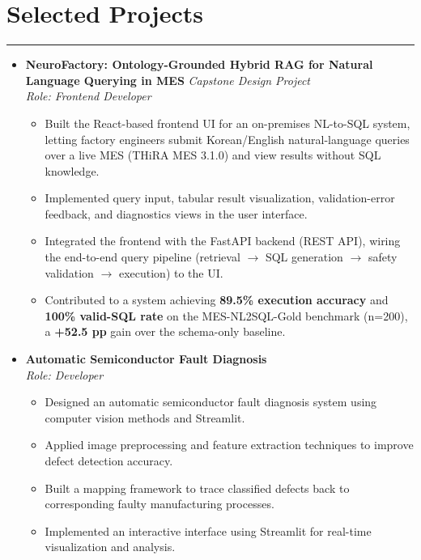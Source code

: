 \documentclass[letterpaper, 10pt]{article}
\begin{document}
\section*{Selected Projects}
\hrule
\vspace{1pt}
\begin{itemize}
    \item[]
        \textbf{NeuroFactory: Ontology-Grounded Hybrid RAG for Natural Language Querying in MES} \hfill \textit{Capstone Design Project} \\
        \textit{Role: Frontend Developer} \vspace{1pt}
        \begin{itemize}
            \item Built the React-based frontend UI for an on-premises NL-to-SQL system, letting factory engineers submit Korean/English natural-language queries over a live MES (THiRA MES 3.1.0) and view results without SQL knowledge.
            \item Implemented query input, tabular result visualization, validation-error feedback, and diagnostics views in the user interface.
            \item Integrated the frontend with the FastAPI backend (REST API), wiring the end-to-end query pipeline (retrieval $\rightarrow$ SQL generation $\rightarrow$ safety validation $\rightarrow$ execution) to the UI.
            \item Contributed to a system achieving \textbf{89.5\% execution accuracy} and \textbf{100\% valid-SQL rate} on the MES-NL2SQL-Gold benchmark (n=200), a \textbf{+52.5 pp} gain over the schema-only baseline.
        \end{itemize}
    \item[]
        \textbf{Automatic Semiconductor Fault Diagnosis} \\
        \textit{Role: Developer} \vspace{1pt}
        \begin{itemize}
            \item Designed an automatic semiconductor fault diagnosis system using computer vision methods and Streamlit.
            \item Applied image preprocessing and feature extraction techniques to improve defect detection accuracy.
            \item Built a mapping framework to trace classified defects back to corresponding faulty manufacturing processes.
            \item Implemented an interactive interface using Streamlit for real-time visualization and analysis.
        \end{itemize}
\end{itemize}
\end{document}
